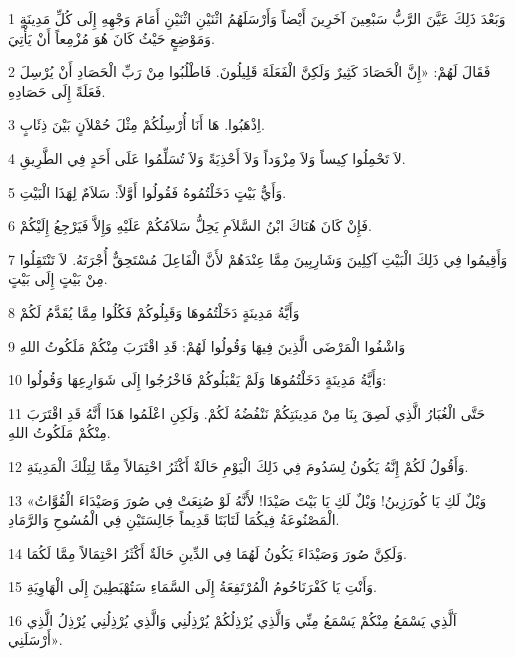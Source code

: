 \par 1 وَبَعْدَ ذَلِكَ عَيَّنَ الرَّبُّ سَبْعِينَ آخَرِينَ أَيْضاً وَأَرْسَلَهُمُ اثْنَيْنِ اثْنَيْنِ أَمَامَ وَجْهِهِ إِلَى كُلِّ مَدِينَةٍ وَمَوْضِعٍ حَيْثُ كَانَ هُوَ مُزْمِعاً أَنْ يَأْتِيَ.
\par 2 فَقَالَ لَهُمْ: «إِنَّ الْحَصَادَ كَثِيرٌ وَلَكِنَّ الْفَعَلَةَ قَلِيلُونَ. فَاطْلُبُوا مِنْ رَبِّ الْحَصَادِ أَنْ يُرْسِلَ فَعَلَةً إِلَى حَصَادِهِ.
\par 3 اِذْهَبُوا. هَا أَنَا أُرْسِلُكُمْ مِثْلَ حُمْلاَنٍ بَيْنَ ذِئَابٍ.
\par 4 لاَ تَحْمِلُوا كِيساً وَلاَ مِزْوَداً وَلاَ أَحْذِيَةً وَلاَ تُسَلِّمُوا عَلَى أَحَدٍ فِي الطَّرِيقِ.
\par 5 وَأَيُّ بَيْتٍ دَخَلْتُمُوهُ فَقُولُوا أَوَّلاً: سَلاَمٌ لِهَذَا الْبَيْتِ.
\par 6 فَإِنْ كَانَ هُنَاكَ ابْنُ السَّلاَمِ يَحِلُّ سَلاَمُكُمْ عَلَيْهِ وَإِلاَّ فَيَرْجِعُ إِلَيْكُمْ.
\par 7 وَأَقِيمُوا فِي ذَلِكَ الْبَيْتِ آكِلِينَ وَشَارِبِينَ مِمَّا عِنْدَهُمْ لأَنَّ الْفَاعِلَ مُسْتَحِقٌّ أُجْرَتَهُ. لاَ تَنْتَقِلُوا مِنْ بَيْتٍ إِلَى بَيْتٍ.
\par 8 وَأَيَّةُ مَدِينَةٍ دَخَلْتُمُوهَا وَقَبِلُوكُمْ فَكُلُوا مِمَّا يُقَدَّمُ لَكُمْ
\par 9 وَاشْفُوا الْمَرْضَى الَّذِينَ فِيهَا وَقُولُوا لَهُمْ: قَدِ اقْتَرَبَ مِنْكُمْ مَلَكُوتُ اللهِ
\par 10 وَأَيَّةُ مَدِينَةٍ دَخَلْتُمُوهَا وَلَمْ يَقْبَلُوكُمْ فَاخْرُجُوا إِلَى شَوَارِعِهَا وَقُولُوا:
\par 11 حَتَّى الْغُبَارُ الَّذِي لَصِقَ بِنَا مِنْ مَدِينَتِكُمْ نَنْفُضُهُ لَكُمْ. وَلَكِنِ اعْلَمُوا هَذَا أَنَّهُ قَدِ اقْتَرَبَ مِنْكُمْ مَلَكُوتُ اللهِ.
\par 12 وَأَقُولُ لَكُمْ إِنَّهُ يَكُونُ لِسَدُومَ فِي ذَلِكَ الْيَوْمِ حَالَةٌ أَكْثَرُ احْتِمَالاً مِمَّا لِتِلْكَ الْمَدِينَةِ.
\par 13 «وَيْلٌ لَكِ يَا كُورَزِينُ! وَيْلٌ لَكِ يَا بَيْتَ صَيْدَا! لأَنَّهُ لَوْ صُنِعَتْ فِي صُورَ وَصَيْدَاءَ الْقُوَّاتُ الْمَصْنُوعَةُ فِيكُمَا لَتَابَتَا قَدِيماً جَالِسَتَيْنِ فِي الْمُسُوحِ وَالرَّمَادِ.
\par 14 وَلَكِنَّ صُورَ وَصَيْدَاءَ يَكُونُ لَهُمَا فِي الدِّينِ حَالَةٌ أَكْثَرُ احْتِمَالاً مِمَّا لَكُمَا.
\par 15 وَأَنْتِ يَا كَفْرَنَاحُومُ الْمُرْتَفِعَةُ إِلَى السَّمَاءِ سَتُهْبَطِينَ إِلَى الْهَاوِيَةِ.
\par 16 اَلَّذِي يَسْمَعُ مِنْكُمْ يَسْمَعُ مِنِّي وَالَّذِي يُرْذِلُكُمْ يُرْذِلُنِي وَالَّذِي يُرْذِلُنِي يُرْذِلُ الَّذِي أَرْسَلَنِي».
